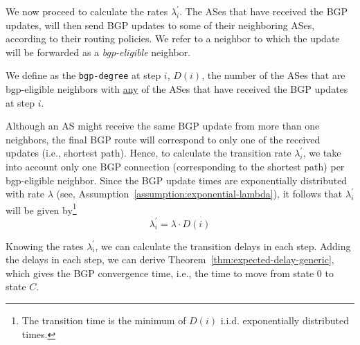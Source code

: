 We now proceed to calculate the rates $\lambda_{i}^{'}$. 
The ASes that have received the BGP updates, will then send BGP updates to some of their neighboring ASes, according to their routing policies. We refer to a neighbor to which the update will be forwarded as a \textit{bgp-eligible} neighbor. 

\begin{definition}\label{def:bgp-degree}
We define as the \texttt{bgp-degree} at step $i$, $D(i)$, the number of the ASes that are bgp-eligible neighbors with \underline{any} of the ASes that have received the BGP updates at step $i$. 
\end{definition}

Although an AS might receive the same BGP update from more than one neighbors, the final BGP route will correspond to only one of the received updates (i.e., shortest path). Hence, to calculate the transition rate $\lambda_{i}^{'}$, we take into account only one BGP connection (corresponding to the shortest path) per bgp-eligible neighbor. Since the BGP update times are exponentially distributed with rate $\lambda$ (see, Assumption~\ref{assumption:exponential-lambda}), it follows that $\lambda_{i}^{'}$ will be given by\footnote{The transition time is the minimum of $D(i)$ i.i.d. exponentially distributed times.}
\begin{equation}\label{eq:lambda-prime}
\lambda_{i}^{'} = \lambda\cdot D(i)
\end{equation}

Knowing the rates $\lambda_{i}^{'}$, we can calculate the transition delays in each step. Adding the delays in each step, we can derive Theorem~\ref{thm:expected-delay-generic}, which gives the BGP convergence time, i.e., the time to move from state $0$ to state $C$. 



